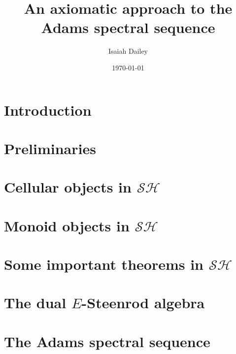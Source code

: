 \documentclass{amsart}
\title{An axiomatic approach to the Adams spectral sequence}
\author{Isaiah Dailey}
\date{\today}
\theoremstyle{plain}
\theoremstyle{definition}
\newcommand{\cSH}{\mathcal{SH}}
\newcommand{\0}{\mathbf{0}}
\renewcommand{\(}{\left(}
\renewcommand{\)}{\right)}
\newcommand{\1}{\mbf{1}}
\begin{document}
\maketitle

\tableofcontents

\section{Introduction}\label{section:intro}



\section{Preliminaries}\label{section:prelims}



\section{Cellular objects in \texorpdfstring{$\cSH$}{SH}}\label{section:cellular}



\section{Monoid objects in \texorpdfstring{$\cSH$}{SH}}\label{section:monoid_in_SH}



\section{Some important theorems in \texorpdfstring{$\cSH$}{SH}}\label{section:important}



\section{The dual \texorpdfstring{$E$}{E}-Steenrod algebra}\label{section:dual_E-Steenrod_algebra}\label{section{dual_E-Steenrod}}



\section{The Adams spectral sequence}\label{section:ASS}
\end{document}
